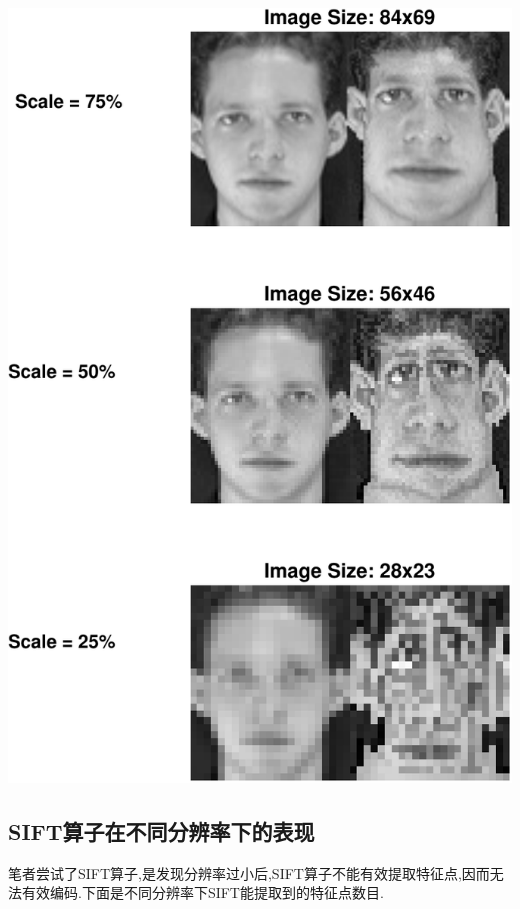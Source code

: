\begin{center}
\begin{minipage}[t]{\linewidth}
\center
{
\captionsetup{justification=centering}
\includegraphics[width=\MyFactor\textwidth]{Img/c4/img_resize} 
}
\end{minipage}
\medskip
\end{center}
\subsection{SIFT算子在不同分辨率下的表现}
笔者尝试了SIFT算子,是发现分辨率过小后,SIFT算子不能有效提取特征点,因而无法有效编码.下面是不同分辨率下SIFT能提取到的特征点数目.

